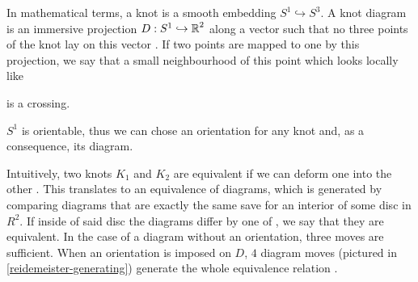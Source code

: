 In mathematical terms, a knot is a smooth embedding $S^1\hookrightarrow S^3$. A knot diagram is an {immersive projection} $D:S^1\hookrightarrow \operatorname{\mathbb{R}}^2$ along a vector such that no three points of the knot lay on this vector \cite{likorish-diagram}. If two points are mapped to one by this projection, we say that a small neighbourhood of this point which looks locally like  is a crossing.


$S^1$ is orientable, thus we can chose an orientation for any knot and, as a consequence, its diagram.

Intuitively, two knots $K_1$ and $K_2$ are equivalent if we can deform one into the other
\cite{murasagi-equivalence}. This translates to an equivalence of diagrams, which is generated by comparing diagrams that are exactly the same save for an interior of some disc in $R^2$. If inside of said disc the diagrams differ by one of , we say that they are equivalent. 
%
%
In the case of a diagram without an orientation, three moves are sufficient. When an orientation is imposed on $D$, $4$ diagram moves (pictured in \cref{reidemeister-generating}) generate the whole equivalence relation \cite{ruchy_zorientowane}.

